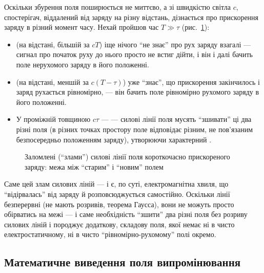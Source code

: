 Оскільки збурення поля поширюється не миттєво, а зі швидкістю світла $c$, спостерігач, віддалений від заряду на різну відстань, дізнається про
прискорення заряду в різний момент часу. Нехай пройшов час $T\gg\tau$ (рис.~\ref{pic:ElementaryModel}):
\begin{itemize}
	\item {} (на відстані, більшій за $cT$) іще нічого \enquote{не знає} про рух заряду взагалі --- сигнал про початок
	      руху до нього просто не встиг дійти, і він і далі бачить поле нерухомого заряду в його  положенні.
	\item {} (на відстані, меншій за $c(T-\tau)$) уже \enquote{знає}, що прискорення закінчилось і заряд рухається
	      рівномірно, --- він бачить поле рівномірно рухомого заряду в його  положенні.
	\item У проміжній  товщиною $c\tau$ ---  --- силові лінії поля мусять
	      \enquote{зшивати} ці два різні поля (в різних точках простору поле відповідає різним, не пов'язаним безпосередньо положенням заряду),
	      утворюючи характерний .
\end{itemize}

\begin{figure}[h!]\centering
	\caption{Заломлені (\enquote{злами}) силові лінії поля короткочасно прискореного заряду:
		межа між \enquote{старим} і \enquote{новим} полем\label{pic:ElementaryModel}}
\end{figure}

\begin{Attention}
	Саме цей злам силових ліній --- і є, по суті, електромагнітна хвиля, що \enquote{відірвалась} від заряду й розповсюджується самостійно.
	Оскільки лінії безперервні (не мають розривів, теорема Гаусса), вони не можуть просто обірватись на межі --- і саме необхідність \enquote{зшити}
	два різні поля без розриву силових ліній і породжує додаткову,  складову поля, якої немає ні в чисто електростатичному, ні
	в чисто \enquote{рівномірно-рухомому} полі окремо.
\end{Attention}

\subsection*{Математичне виведення поля випромінювання}

